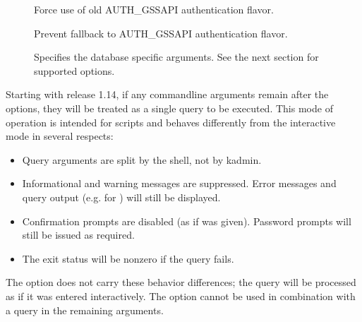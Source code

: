 \documentclass[letterpaper,10pt,english]{sphinxmanual}
\begin{document}
\begin{description}
\item[{}] \leavevmode
\sphinxAtStartPar
Force use of old AUTH\_GSSAPI authentication flavor.

\item[{}] \leavevmode
\sphinxAtStartPar
Prevent fallback to AUTH\_GSSAPI authentication flavor.

\item[{ }] \leavevmode
\sphinxAtStartPar
Specifies the database specific arguments.  See the next section
for supported options.

\end{description}

\sphinxAtStartPar
Starting with release 1.14, if any command\sphinxhyphen{}line arguments remain after
the options, they will be treated as a single query to be executed.
This mode of operation is intended for scripts and behaves differently
from the interactive mode in several respects:
\begin{itemize}
\item {} 
\sphinxAtStartPar
Query arguments are split by the shell, not by kadmin.

\item {} 
\sphinxAtStartPar
Informational and warning messages are suppressed.  Error messages
and query output (e.g. for ) will still be
displayed.

\item {} 
\sphinxAtStartPar
Confirmation prompts are disabled (as if  was given).
Password prompts will still be issued as required.

\item {} 
\sphinxAtStartPar
The exit status will be non\sphinxhyphen{}zero if the query fails.

\end{itemize}

\sphinxAtStartPar
The  option does not carry these behavior differences; the query
will be processed as if it was entered interactively.  The 
option cannot be used in combination with a query in the remaining
arguments.
\end{document}
